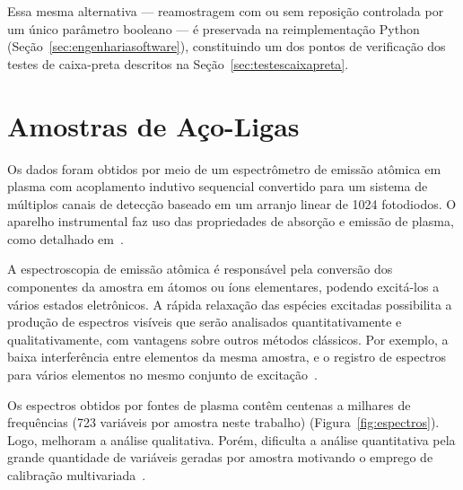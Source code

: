 Essa mesma alternativa --- reamostragem com ou sem reposição controlada por um único parâmetro booleano --- é preservada na reimplementação Python (Seção~\ref{sec:engenhariasoftware}), constituindo um dos pontos de verificação dos testes de caixa-preta descritos na Seção~\ref{sec:testescaixapreta}.


\section{Amostras de Aço-Ligas}
\label{sec:amoacolig}
Os dados foram obtidos por meio de um espectrômetro de emissão atômica em plasma com acoplamento indutivo sequencial convertido para um sistema de múltiplos canais de detecção baseado em um arranjo linear de 1024 fotodiodos. O aparelho instrumental faz uso das propriedades de absorção e emissão de plasma, como detalhado em~\cite{PIMENTEL:1998}.

A espectroscopia de emissão atômica é responsável pela conversão dos componentes da amostra em átomos ou íons elementares, podendo excitá-los a vários estados eletrônicos. A rápida relaxação das espécies excitadas possibilita a produção de espectros visíveis que serão analisados quantitativamente e qualitativamente, com vantagens sobre outros métodos clássicos. Por exemplo, a baixa interferência entre elementos da mesma amostra, e o registro de espectros para vários elementos no mesmo conjunto de excitação~\cite{SKOOG:1997}.

Os espectros obtidos por fontes de plasma contêm centenas a milhares de frequências (723 variáveis por amostra neste trabalho) (Figura~\ref{fig:espectros}). Logo, melhoram a análise qualitativa. Porém, dificulta a análise quantitativa pela grande quantidade de variáveis geradas por amostra motivando o emprego de calibração multivariada~\cite{KRAMER:1998,MARTENS:1989}.

